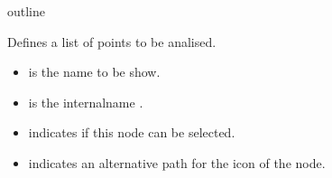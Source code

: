 \bigskip
\xmlstruct
{outline}
{
%
  Defines a list of points to be analised.
\begin{itemize}
  \item {} is the name to be show.
   \item {} is the internalname .
\item {} indicates if this node can be
  selected.
\item {} indicates an alternative path for the icon
  of the node.

\end{itemize}
%
}
{}


